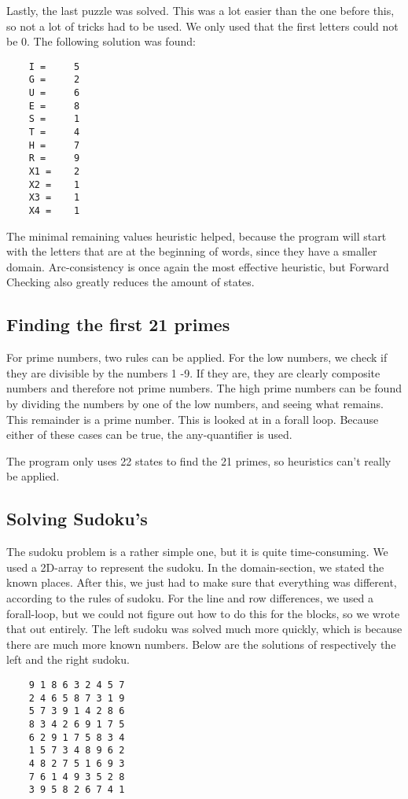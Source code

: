 \documentclass{article}
\begin{document}
	Lastly, the last puzzle was solved. This was a lot easier than the one before this, so not a lot of tricks had to be used. We only used that the first letters could not be 0. The following solution was found:
	\begin{lstlisting}
	I = 	5 
	G = 	2 
	U = 	6 
	E = 	8 
	S = 	1 
	T = 	4 
	H = 	7 
	R = 	9 
	X1 = 	2 
	X2 = 	1 
	X3 = 	1 
	X4 = 	1 
	\end{lstlisting}
	
	The minimal remaining values heuristic helped, because the program will start with the letters that are at the beginning of words, since they have a smaller domain. Arc-consistency is once again the most effective heuristic, but Forward Checking also greatly reduces the amount of states. 
	
	\subsection*{Finding the first 21 primes}
	
	For prime numbers, two rules can be applied. For the low numbers, we check if they are divisible by the numbers 1 -9. If they are, they are clearly composite numbers and therefore not prime numbers. The high prime numbers can be found by dividing the numbers by one of the low numbers, and seeing what remains. This remainder is a prime number. This is looked at in a forall loop. Because either of these cases can be true, the any-quantifier is used.
	
	The program only uses 22 states to find the 21 primes, so heuristics can't really be applied. 
	
	\subsection*{Solving Sudoku's}
	
	The sudoku problem is a rather simple one, but it is quite time-consuming. We used a 2D-array to represent the sudoku. In the domain-section, we stated the known places. After this, we just had to make sure that everything was different, according to the rules of sudoku. For the line and row differences, we used a forall-loop, but we could not figure out how to do this for the blocks, so we wrote that out entirely. The left sudoku was solved much more quickly, which is because there are much more known numbers.
	Below are the solutions of respectively the left and the right sudoku.
	
	\begin{lstlisting}
	9 1 8 6 3 2 4 5 7 
	2 4 6 5 8 7 3 1 9 
	5 7 3 9 1 4 2 8 6 
	8 3 4 2 6 9 1 7 5 
	6 2 9 1 7 5 8 3 4 
	1 5 7 3 4 8 9 6 2 
	4 8 2 7 5 1 6 9 3 
	7 6 1 4 9 3 5 2 8 
	3 9 5 8 2 6 7 4 1 
		
	\end{lstlisting}
	
\end{document}
